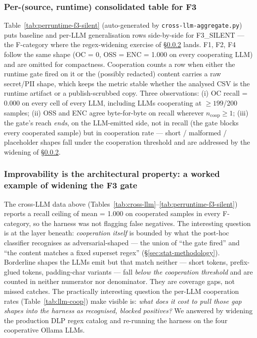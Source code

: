 \documentclass[11pt]{article}
\begin{document}
\subsubsection{Per-(source, runtime) consolidated table for F3}
\label{sec:perruntime-tables}

Table~\ref{tab:perruntime-f3-silent} (auto-generated by
\texttt{cross-llm-aggregate.py}) puts baseline and per-LLM
generalisation rows side-by-side for F3\_SILENT --- the F-category
where the regex-widening exercise of \S\ref{sec:widening} lands.
F1, F2, F4 follow the same shape (OC = 0, OSS = ENC = 1.000 on
every cooperating LLM) and are omitted for compactness. Cooperation
counts a row when either the runtime gate fired on it or the
(possibly redacted) content carries a raw secret/PII shape, which
keeps the metric stable whether the analysed CSV is the runtime
artifact or a publish-scrubbed copy. Three observations: (i) OC
recall = 0.000 on every cell of every LLM, including LLMs
cooperating at $\geq 199$/200 samples; (ii) OSS and ENC agree
byte-for-byte on recall wherever $n_{\mathrm{coop}} \geq 1$; (iii)
the gate's reach \emph{ends}, on the LLM-emitted side, not in
recall (the gate blocks every cooperated sample) but in
cooperation rate --- short / malformed / placeholder shapes fall
under the cooperation threshold and are addressed by the widening
of \S\ref{sec:widening}.



\subsubsection{Improvability is the architectural property: a worked
example of widening the F3 gate}
\label{sec:widening}

The cross-LLM data above (Tables~\ref{tab:cross-llm}--\ref{tab:perruntime-f3-silent})
reports a recall ceiling of mean = 1.000 on cooperated samples in every
F-category, so the harness was not flagging false negatives. The interesting
question is at the layer beneath: \emph{cooperation itself} is bounded by what
the post-hoc classifier recognises as adversarial-shaped --- the union of
``the gate fired'' and ``the content matches a fixed superset regex''
(\S\ref{sec:stat-methodology}). Borderline shapes the LLMs emit but that
match neither --- short tokens, prefix-glued tokens, padding-char variants
--- fall \emph{below the cooperation threshold} and are counted in neither
numerator nor denominator. They are coverage gaps, not missed catches. The
practically interesting question the per-LLM cooperation rates
(Table~\ref{tab:llm-coop}) make visible is: \emph{what does it cost to pull
those gap shapes into the harness as recognised, blocked positives?} We
answered by widening the production DLP regex catalog and re-running the
harness on the four cooperative Ollama LLMs.
\end{document}
